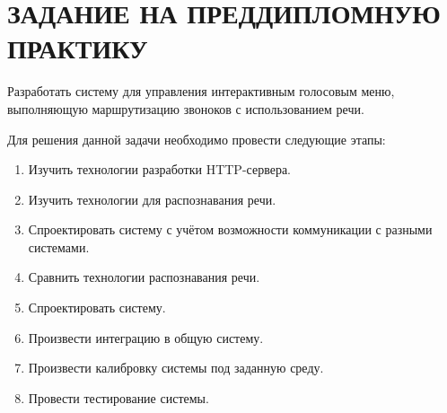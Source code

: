 \chapter{ЗАДАНИЕ НА ПРЕДДИПЛОМНУЮ ПРАКТИКУ}

Разработать систему для управления интерактивным голосовым меню,
выполняющую маршрутизацию звоноков с использованием речи.

Для решения данной задачи необходимо провести следующие этапы:
\begin{enumerate}
    \item Изучить технологии разработки HTTP-сервера.
    \item Изучить технологии для распознавания речи.
    \item Спроектировать систему с учётом возможности коммуникации с разными системами.
    \item Сравнить технологии распознавания речи.
    \item Спроектировать систему.
    \item Произвести интеграцию в общую систему.
    \item Произвести калибровку системы под заданную среду.
    \item Провести тестирование системы.
\end{enumerate}
